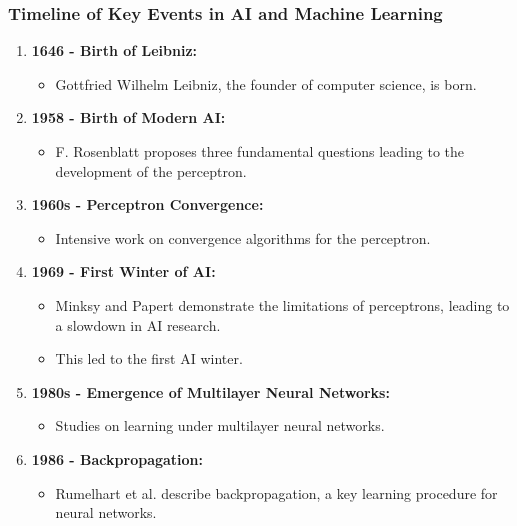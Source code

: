 \begin{frame}
    \frametitle{Timeline of Key Events in AI and Machine Learning}
    \begin{enumerate}
        \item \textbf{1646 - Birth of Leibniz:}
              \begin{itemize}
                  \item Gottfried Wilhelm Leibniz, the founder of computer science, is born.
              \end{itemize}

        \item \textbf{1958 - Birth of Modern AI:}
              \begin{itemize}
                  \item F. Rosenblatt proposes three fundamental questions leading to the development of the perceptron.
              \end{itemize}

        \item \textbf{1960s - Perceptron Convergence:}
              \begin{itemize}
                  \item Intensive work on convergence algorithms for the perceptron.
              \end{itemize}

        \item \textbf{1969 - First Winter of AI:}
              \begin{itemize}
                  \item Minksy and Papert demonstrate the limitations of perceptrons, leading to a slowdown in AI research.
                  \item This led to the first AI winter.
              \end{itemize}

        \item \textbf{1980s - Emergence of Multilayer Neural Networks:}
              \begin{itemize}
                  \item Studies on learning under multilayer neural networks.
              \end{itemize}

        \item \textbf{1986 - Backpropagation:}
              \begin{itemize}
                  \item Rumelhart et al. describe backpropagation, a key learning procedure for neural networks.
              \end{itemize}


\end{enumerate}
\end{frame}
